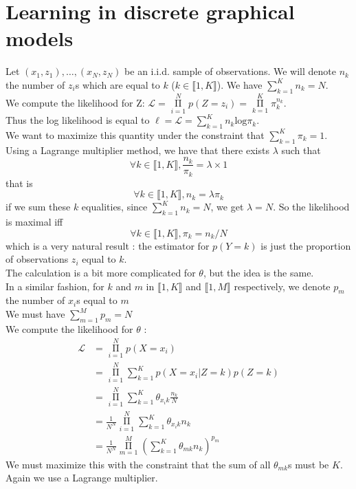 \documentclass[11pt,a4paper]{article}
\begin{document}
\section{Learning in discrete graphical models}

Let $(x_1, z_1), \ldots, (x_N, z_N)$ be an i.i.d. sample of observations. We will denote $n_k$ the number of $z_i$s which are equal to $k$ ($k \in \llbracket 1, K \rrbracket$). We have $\sum\limits_{k=1}^{K} n_k = N$.
\\We compute the likelihood for Z: $\mathcal{L} = \mathop{\Pi}\limits_{i=1}^N p(Z = z_i) = \mathop{\Pi}\limits_{k=1}^K \pi_k^{n_k}$.
\\Thus the log likelihood is equal to $\ell = \mathcal{L} = \sum\limits_{k=1}^K n_k \mathrm{log} \pi_k$.
\\We want to maximize this quantity under the constraint that $\sum\limits_{k=1}^{K} \pi_k = 1$. Using a Lagrange multiplier method, we have that there exists $\lambda$ such that $$\forall k \in \llbracket 1, K \rrbracket, \frac{n_k}{\pi_k} = \lambda \times 1$$
that is $$\forall k \in \llbracket 1, K \rrbracket, n_k = \lambda \pi_k$$
if we sum these $k$ equalities, since $\sum\limits_{k=1}^{K} n_k = N$, we get $\lambda = N$.
So the likelihood is maximal iff $$\forall k \in \llbracket 1, K \rrbracket,  \pi_k = n_k/N$$
which is a very natural result : the estimator for $p(Y=k)$ is just the proportion of observations $z_i$ equal to $k$.
\\[5mm]The calculation is a bit more complicated for $\theta$, but the idea is the same.
\\In a similar fashion, for $k$ and $m$ in $\llbracket 1, K \rrbracket$ and $\llbracket 1, M \rrbracket$ respectively, we denote $p_{m}$ the number of $x_i$s equal to $m$
\\We must have $\sum\limits_{m=1}^{M}  p_{m} = N$
\\We compute the likelihood for $\theta$ : 
$$\begin{aligned} \mathcal{L} &= \mathop{\Pi}\limits_{i=1}^N p(X = x_i) \\
 &= \mathop{\Pi}\limits_{i=1}^N \sum\limits_{k=1}^K p(X=x_i | Z= k) p(Z=k)\\
 & = \mathop{\Pi}\limits_{i=1}^N  \sum\limits_{k=1}^K \theta_{x_i k} \frac{n_k}{N} \\
  & = \frac{1}{N^N} \mathop{\Pi}\limits_{i=1}^N  \sum\limits_{k=1}^K \theta_{x_i k} n_k \\
    & = \frac{1}{N^N} \mathop{\Pi}\limits_{m=1}^M ( \sum\limits_{k=1}^K \theta_{m k} n_k )^{p_m}
 \end{aligned}$$
We must maximize this with the constraint that the sum of all $\theta_{m k}$s must be $K$.
\\Again we use a Lagrange multiplier.
\end{document}
